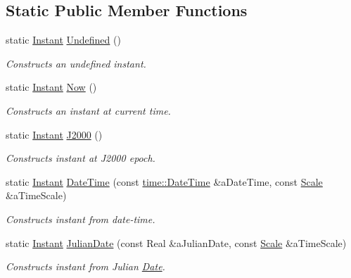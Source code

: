 \subsection*{Static Public Member Functions}
\begin{DoxyCompactItemize}
\item 
static \hyperlink{classlibrary_1_1physics_1_1time_1_1_instant}{Instant} \hyperlink{classlibrary_1_1physics_1_1time_1_1_instant_aae55667866c1d0c4a94650673c6b712c}{Undefined} ()
\begin{DoxyCompactList}\small\item\em Constructs an undefined instant. \end{DoxyCompactList}\item 
static \hyperlink{classlibrary_1_1physics_1_1time_1_1_instant}{Instant} \hyperlink{classlibrary_1_1physics_1_1time_1_1_instant_abdee2ddacb34859a3be2a4cf97c4af81}{Now} ()
\begin{DoxyCompactList}\small\item\em Constructs an instant at current time. \end{DoxyCompactList}\item 
static \hyperlink{classlibrary_1_1physics_1_1time_1_1_instant}{Instant} \hyperlink{classlibrary_1_1physics_1_1time_1_1_instant_a2a4f57aa71693b8def06788d55bc3bd3}{J2000} ()
\begin{DoxyCompactList}\small\item\em Constructs instant at J2000 epoch. \end{DoxyCompactList}\item 
static \hyperlink{classlibrary_1_1physics_1_1time_1_1_instant}{Instant} \hyperlink{classlibrary_1_1physics_1_1time_1_1_instant_ac827b6ffa57ce75a3c56c462d4c872f8}{Date\+Time} (const \hyperlink{classlibrary_1_1physics_1_1time_1_1_date_time}{time\+::\+Date\+Time} \&a\+Date\+Time, const \hyperlink{namespacelibrary_1_1physics_1_1time_a09d2bc9fbc7b0b5f92e1419bd655e6bb}{Scale} \&a\+Time\+Scale)
\begin{DoxyCompactList}\small\item\em Constructs instant from date-\/time. \end{DoxyCompactList}\item 
static \hyperlink{classlibrary_1_1physics_1_1time_1_1_instant}{Instant} \hyperlink{classlibrary_1_1physics_1_1time_1_1_instant_a06f5e092a3a5ee126c9521c12e349d56}{Julian\+Date} (const Real \&a\+Julian\+Date, const \hyperlink{namespacelibrary_1_1physics_1_1time_a09d2bc9fbc7b0b5f92e1419bd655e6bb}{Scale} \&a\+Time\+Scale)
\begin{DoxyCompactList}\small\item\em Constructs instant from Julian \hyperlink{classlibrary_1_1physics_1_1time_1_1_date}{Date}. \end{DoxyCompactList}\item 

\end{DoxyCompactItemize}
